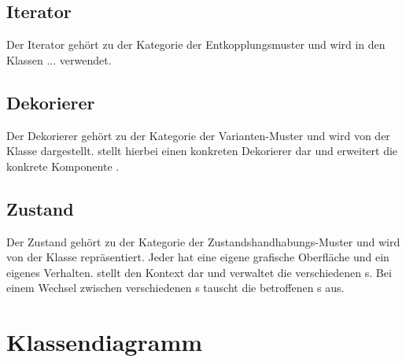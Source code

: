 \subsection{Iterator}
Der Iterator gehört zu der Kategorie der Entkopplungsmuster und wird in den Klassen ... verwendet.

\subsection{Dekorierer}
Der Dekorierer gehört zu der Kategorie der Varianten-Muster und wird von der Klasse  dargestellt. 
 stellt hierbei einen konkreten Dekorierer dar und erweitert die konkrete Komponente .

\subsection{Zustand}
Der Zustand gehört zu der Kategorie der Zustandshandhabungs-Muster und wird von der Klasse  repräsentiert. Jeder  hat eine eigene grafische Oberfläche und ein eigenes Verhalten.
 stellt den Kontext dar und verwaltet die verschiedenen s. Bei einem Wechsel zwischen verschiedenen s tauscht  die betroffenen s aus.

\section{Klassendiagramm}

